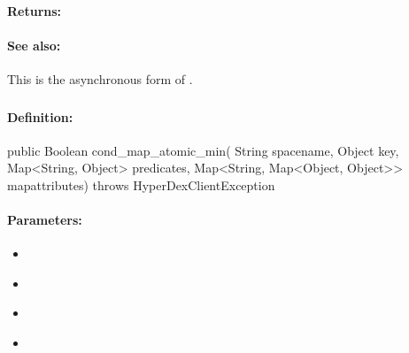 \paragraph{Returns:}


\paragraph{See also:}  This is the asynchronous form of .

\pagebreak
\subsubsection{}
\label{api:java:cond_map_atomic_min}


\paragraph{Definition:}
\begin{javacode}
public Boolean cond_map_atomic_min(
        String spacename,
        Object key,
        Map<String, Object> predicates,
        Map<String, Map<Object, Object>> mapattributes) throws HyperDexClientException
\end{javacode}

\paragraph{Parameters:}
\begin{itemize}[noitemsep]
\item {}\\

\item {}\\

\item {}\\

\item {}\\

\end{itemize}

